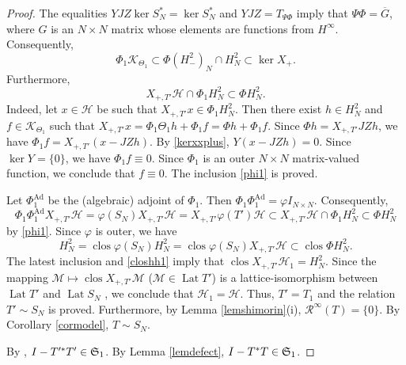 \documentclass[a4paper,oneside,11pt]{amsart}
\numberwithin{equation}{section}
\theoremstyle{plain}
\theoremstyle{definition}
\begin{document}
\begin{proof}
 The equalities $YJZ\ker S_N^*=\ker S_N^*$ and $YJZ=T_{\Psi\Phi}$ imply that 
$\Psi\Phi=\overline G$, where $G$ is an $N\times N$ matrix whose elements are functions from $H^\infty$. 
Consequently,
\begin{equation} \label{kerxxplus} \Phi_1\mathcal K_{\Theta_1}\subset\Phi(H^2_-)_N\cap H^2_N\subset\ker X_+.
\end{equation}
Furthermore, 
 \begin{equation} \label{phi1} X_{+,T'}\mathcal H\cap\Phi_1 H^2_N\subset\Phi H^2_N.
\end{equation} 
Indeed, let $x\in\mathcal H$ be such that $X_{+,T'}x\in\Phi_1 H^2_N$. Then there exist $h\in H^2_N$ and 
 $f\in\mathcal K_{\Theta_1}$ such that  $X_{+,T'}x=\Phi_1\Theta_1 h+\Phi_1 f= \Phi h+\Phi_1 f$.  
Since $\Phi h=X_{+,T'}JZh$, we have   $\Phi_1 f=X_{+,T'}(x-JZh) $.  By \eqref{kerxxplus}, $Y(x-JZh)=0$. Since $\ker Y=\{0\}$, we have 
$\Phi_1 f\equiv 0$. Since $\Phi_1$ is an outer $N\times N$ matrix-valued function, we conclude that $f\equiv 0$. The inclusion \eqref{phi1} is proved.

Let $\Phi_1^{\mathrm{Ad}}$ be the (algebraic) adjoint of $\Phi_1$. Then $\Phi_1\Phi_1^{\mathrm{Ad}}=\varphi I_{N\times N}$. 
Consequently, 
\begin{equation*} \Phi_1\Phi_1^{\mathrm{Ad}}X_{+,T'}\mathcal H=\varphi(S_N)X_{+,T'}\mathcal H
=X_{+,T'}\varphi(T')\mathcal H\subset 
X_{+,T'}\mathcal H\cap\Phi_1 H^2_N\subset\Phi H^2_N
\end{equation*} 
by \eqref{phi1}. Since $\varphi$ is outer, we have 
\begin{equation*}H^2_N=\operatorname{clos}\varphi(S_N)H^2_N=
\operatorname{clos}\varphi(S_N)X_{+,T'}\mathcal H\subset\operatorname{clos}\Phi H^2_N.\end{equation*}
The latest inclusion and  \eqref{closhh1} imply that $\operatorname{clos} X_{+,T'}\mathcal H_1 =H^2_N$.  Since the mapping 
$\mathcal M\mapsto\operatorname{clos} X_{+,T'}\mathcal M$ ($\mathcal M\in\operatorname{Lat}T'$) 
 is a lattice-isomorphism between $\operatorname{Lat}T'$ and   $\operatorname{Lat}S_N$ \cite{gamal02},
 we conclude that $\mathcal H_1=\mathcal H$. Thus, $T'=T_1$ and the relation $T'\sim S_N$ is proved. 
Furthermore, by Lemma \ref{lemshimorin}(i),  $\mathcal R^\infty(T)=\{0\}$. By Corollary \ref{cormodel}, $T\sim S_N$. 

By \cite{gamal}, 
$I-T'^*T'\in\frak S_1$. By Lemma \ref{lemdefect},  $I-T^*T\in\frak S_1$. 
\end{proof}
\end{document}
